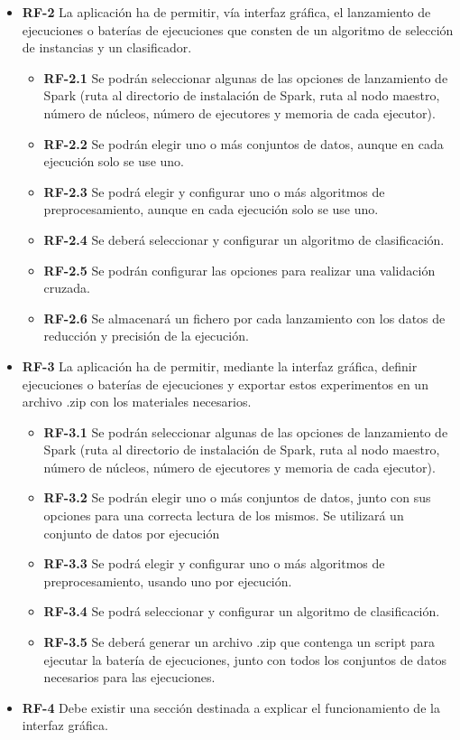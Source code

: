 \begin{itemize}
\item \textbf{RF-2} La aplicación ha de permitir, vía interfaz gráfica, el lanzamiento de ejecuciones o baterías de ejecuciones que consten de un algoritmo de selección de instancias y un clasificador.
	\begin{itemize}
		\item \textbf{RF-2.1} Se podrán seleccionar algunas de las opciones de lanzamiento de Spark (ruta al directorio de instalación de Spark, ruta al nodo maestro, número de núcleos, número de ejecutores y memoria de cada ejecutor).
		\item \textbf{RF-2.2} Se podrán elegir uno o más conjuntos de datos, aunque en cada ejecución solo se use uno.
		\item \textbf{RF-2.3} Se podrá elegir y configurar uno o más algoritmos de preprocesamiento, aunque en cada ejecución solo se use uno.
		\item \textbf{RF-2.4} Se deberá seleccionar y configurar un algoritmo de clasificación.
		\item \textbf{RF-2.5} Se podrán configurar las opciones para realizar una validación cruzada.
		\item \textbf{RF-2.6} Se almacenará un fichero por cada lanzamiento con los datos de reducción y precisión de la ejecución.
	\end{itemize}

\item \textbf{RF-3} La aplicación ha de permitir, mediante la interfaz gráfica, definir ejecuciones o baterías de ejecuciones y exportar estos experimentos en un archivo .zip con los materiales necesarios.
	\begin{itemize}
		\item \textbf{RF-3.1} Se podrán seleccionar algunas de las opciones de lanzamiento de Spark (ruta al directorio de instalación de Spark, ruta al nodo maestro, número de núcleos, número de ejecutores y memoria de cada ejecutor).
		\item \textbf{RF-3.2} Se podrán elegir uno o más conjuntos de datos, junto con sus opciones para una correcta lectura de los mismos. Se utilizará un conjunto de datos por ejecución
		\item \textbf{RF-3.3} Se podrá elegir y configurar uno o más algoritmos de preprocesamiento, usando uno por ejecución.
		\item \textbf{RF-3.4} Se podrá seleccionar y configurar un algoritmo de clasificación.
		\item \textbf{RF-3.5} Se deberá generar un archivo .zip que contenga un script para ejecutar la batería de ejecuciones, junto con todos los conjuntos de datos necesarios para las ejecuciones.
	\end{itemize}

\item \textbf{RF-4} Debe existir una sección destinada a explicar el funcionamiento de la interfaz gráfica.

\end{itemize}

